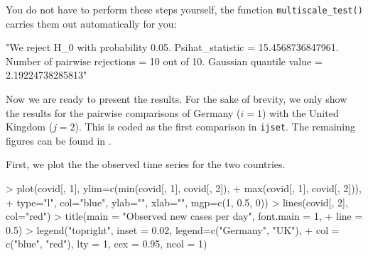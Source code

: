 \documentclass[a4paper]{article}
\begin{document}
You do not have to perform these steps yourself, the function \verb|multiscale_test()| carries them out automatically for you:

\begin{Schunk}
\begin{Soutput}
[1] "We reject H_0 with probability 0.05. Psihat_statistic = 15.4568736847961. Number of pairwise rejections = 10 out of 10. Gaussian quantile value = 2.19224738285813"
\end{Soutput}
\end{Schunk}

Now we are ready to present the results. For the sake of brevity, we only show the results for the pairwise comparisons of Germany ($i = 1$) with the United Kingdom ($j = 2$). This is coded as the first comparison in \verb|ijset|. The remaining figures can be found in \cite{KhismatullinaVogt2023}.

First, we plot the the observed time series for the two countries.

\begin{Schunk}
\begin{Sinput}
> plot(covid[, 1], ylim=c(min(covid[, 1], covid[, 2]),
+                         max(covid[, 1], covid[, 2])),
+      type="l", col="blue", ylab="", xlab="", mgp=c(1, 0.5, 0))
> lines(covid[, 2], col="red")
> title(main = "Observed new cases per day", font.main = 1,
+       line = 0.5)
> legend("topright", inset = 0.02, legend=c("Germany", "UK"),
+        col = c("blue", "red"), lty = 1, cex = 0.95, ncol = 1)
\end{Sinput}
\end{Schunk}
\end{document}
